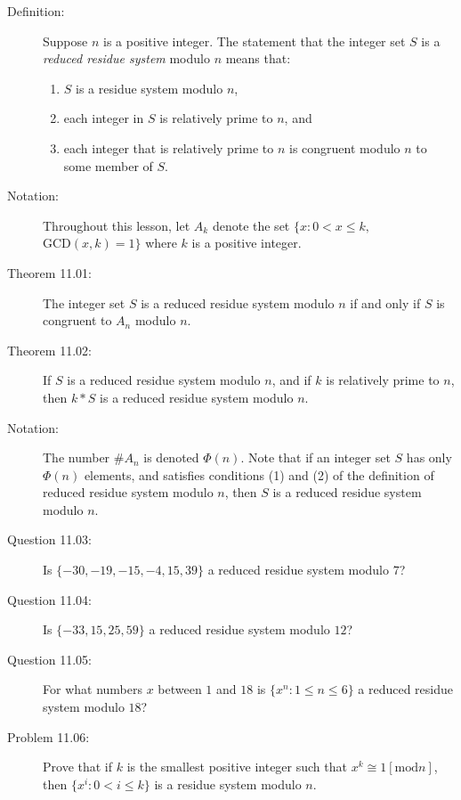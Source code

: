 \documentclass{article}
\begin{document}
\begin{description}

  \item[Definition:] Suppose $n$ is a positive integer. The statement that the integer set $S$ is a \emph{reduced residue system} modulo $n$ means that: 
    \begin{enumerate}[(1)]
      \item $S$ is a residue system modulo $n$, 
      \item each integer in $S$ is relatively prime to $n$, and 
      \item each integer that is relatively prime to $n$ is congruent modulo $n$ to some member of $S$.
    \end{enumerate}

  \item[Notation:] Throughout this lesson, let $A_k$ denote the set $\{ x: 0 < x \leq k,$ $\text{GCD}(x,k)=1 \}$ where $k$ is a positive integer.

  \item[Theorem 11.01:] The integer set $S$ is a reduced residue system modulo $n$ if and only if $S$ is congruent to $A_n$ modulo $n$.

  \item[Theorem 11.02:] If $S$ is a reduced residue system modulo $n$, and if $k$ is relatively prime to $n$, then $k*S$ is a reduced residue system modulo $n$.

  \item[Notation:] The number $\#A_n$ is denoted $\Phi(n)$. Note that if an integer set $S$ has only $\Phi(n)$ elements, and satisfies conditions (1) and (2) of the definition of reduced residue system modulo $n$, then $S$ is a reduced residue system modulo $n$.

  \item[Question 11.03:] Is $\{ -30, -19, -15, -4, 15, 39 \}$ a reduced residue system modulo $7$?

  \item[Question 11.04:] Is $\{ -33, 15, 25, 59 \}$ a reduced residue system modulo $12$?

  \item[Question 11.05:] For what numbers $x$ between $1$ and $18$ is $\{ x^n: 1 \leq n \leq 6 \}$ a reduced residue system modulo $18$?

  \item[Problem 11.06:] Prove that if $k$ is the smallest positive integer such that $x^k \cong 1 [\text{mod} n]$, then $\{ x^i: 0 < i \leq k \}$ is a residue system modulo $n$.


\end{description}
\end{document}
